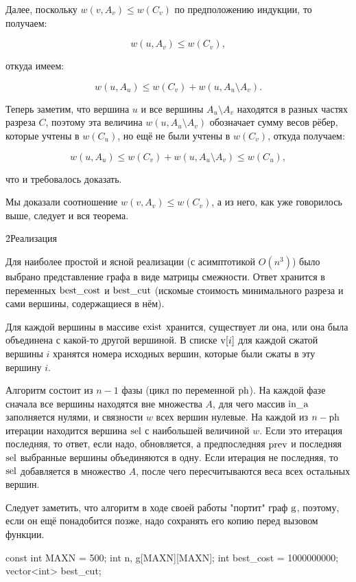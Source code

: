 Далее, поскольку $w(v,A_v) \le w(C_v)$ по предположению индукции, то получаем:

$$ w(u,A_v) \le w(C_v), $$

откуда имеем:

$$ w(u,A_u) \le w(C_v) + w(u,A_u \setminus A_v). $$

Теперь заметим, что вершина $u$ и все вершины $A_u \setminus A_v$ находятся в разных частях разреза $C$, поэтому эта величина $w(u,A_u \setminus A_v)$ обозначает сумму весов рёбер, которые учтены в $w(C_u)$, но ещё не были учтены в $w(C_v)$, откуда получаем:

$$ w(u,A_u) \le w(C_v) + w(u,A_u \setminus A_v) \le w(C_u), $$

что и требовалось доказать.

Мы доказали соотношение $w(v,A_v) \le w(C_v)$, а из него, как уже говорилось выше, следует и вся теорема.


\h2{Реализация}

Для наиболее простой и ясной реализации (с асимптотикой $O(n^3)$) было выбрано представление графа в виде матрицы смежности. Ответ хранится в переменных $\rm best\_cost$ и $\rm best\_cut$ (искомые стоимость минимального разреза и сами вершины, содержащиеся в нём).

Для каждой вершины в массиве $\rm exist$ хранится, существует ли она, или она была объединена с какой-то другой вершиной. В списке ${\rm v}[i]$ для каждой сжатой вершины $i$ хранятся номера исходных вершин, которые были сжаты в эту вершину $i$.

Алгоритм состоит из $n-1$ фазы (цикл по переменной $\rm ph$). На каждой фазе сначала все вершины находятся вне множества $A$, для чего массив $\rm in\_a$ заполняется нулями, и связности $w$ всех вершин нулевые. На каждой из $n-{\rm ph}$ итерации находится вершина $\rm sel$ с наибольшей величиной $w$. Если это итерация последняя, то ответ, если надо, обновляется, а предпоследняя $\rm prev$ и последняя $\rm sel$ выбранные вершины объединяются в одну. Если итерация не последняя, то $\rm sel$ добавляется в множество $A$, после чего пересчитываются веса всех остальных вершин.

Следует заметить, что алгоритм в ходе своей работы "портит" граф $\rm g$, поэтому, если он ещё понадобится позже, надо сохранять его копию перед вызовом функции.

\code
const int MAXN = 500;
int n, g[MAXN][MAXN];
int best_cost = 1000000000;
vector<int> best_cut;

